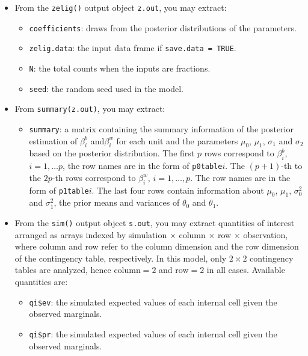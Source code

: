 \begin{itemize}
\item From the \texttt{zelig()} output object \texttt{z.out}, 
you may extract:

\begin{itemize}
\item \texttt{coefficients}: draws from the posterior distributions
of the parameters.
   \item {\tt zelig.data}: the input data frame if {\tt save.data = TRUE}.  
\item \texttt{N}: the total counts when the inputs are fractions.
\item \texttt{seed}: the random seed used in the model.
\end{itemize}

\item From \texttt{summary(z.out)}, you may extract:
\begin{itemize}
\item \texttt{summary}: a matrix containing the summary information of the 
posterior estimation of $\beta^b_i$ and$\beta^w_i$ for each unit and
the parameters $\mu_0$, $\mu_1$, $\sigma_1$ and $\sigma_2$ based on
the posterior distribution.  The first $p$ rows correspond to
$\beta_i^b$, $i=1,\ldots p$, the row names are in the form of
\texttt{p0table}$i$. The $(p+1)$-th to the $2p$-th rows correspond to
$\beta_i^w$, $i=1,\ldots,p$. The row names are in the form of
\texttt{p1table}$i$. The last four rows contain information about
$\mu_0$, $\mu_1$, $\sigma_0^2$ and $\sigma_1^2$, the prior means and
variances of $\theta_0$ and $\theta_1$. 
\end{itemize}
\item From the \texttt{sim()} output object \texttt{s.out}, you may
extract quantities of interest arranged as arrays indexed by
simulation $\times$ column $\times$ row $\times$ observation, where
column and row refer to the column dimension and the row dimension of
the contingency table, respectively. In this model, only $2 \times 2$
contingency tables are analyzed, hence column$=2$ and row$=2$ in all
cases. Available quantities are:
\begin{itemize}
\item \texttt{qi\$ev}: the simulated expected values of each internal cell
given the observed marginals. 
\item \texttt{qi\$pr}: the simulated expected values of each internal cell 
given the observed marginals.  
\end{itemize}

\end{itemize}


